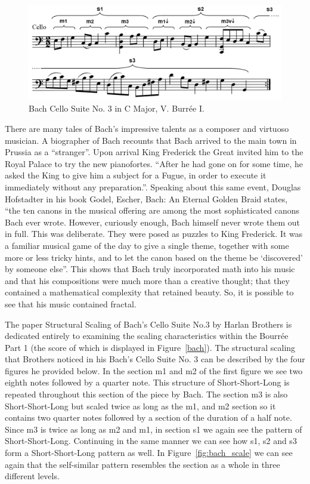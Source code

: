 \documentclass{article}
\begin{document}
\begin{figure}[ht!]
    \centering
    \includegraphics[width=\linewidth]{figures/bach_cello.png}
    \caption{%
        Bach Cello Suite No. 3 in C Major, V. Burrée I.
    }\label{fig:bach}
\end{figure}

There are many tales of Bach's impressive talents as a composer and virtuoso
musician. A biographer of Bach recounts that Bach arrived to the main  town in
Prussia as a “stranger”. Upon arrival King Frederick the Great invited him to
the Royal Palace to try the new pianofortes. ``After he had gone on for some
time, he asked the King to give him a subject for a Fugue, in order to execute
it immediately without any preparation.''\cite{6}. Speaking about this same event,
Douglas Hofstadter in his book Godel, Escher, Bach: An Eternal Golden Braid
states, ``the ten canons in the musical offering are among the most sophisticated
canons Bach ever wrote. However, curiously enough, Bach himself never wrote them
out in full. This was deliberate. They were posed as puzzles to King Frederick.
It was a familiar musical game of the day to give a single theme, together with
some more or less tricky hints, and to let the canon based on the theme be
`discovered' by someone else''\cite{7}. This shows that Bach truly incorporated math
into his music and that his compositions were much more than a creative thought;
that they contained a mathematical complexity that retained beauty. So, it is
possible to see that his music contained fractal.

The paper Structural Scaling of Bach’s Cello Suite No.3 by Harlan Brothers is
dedicated entirely to examining the scaling characteristics within the Bourrée
Part 1 (the score of which is displayed in Figure~\ref{bach}). The structural
scaling that Brothers noticed in his Bach’s Cello Suite No. 3 can be described
by the four figures he provided below. In the section m1 and m2 of the first
figure we see two eighth notes followed by a
quarter note. This structure of Short-Short-Long is repeated throughout this
section of the piece by Bach. The section m3 is also Short-Short-Long but scaled
twice as long as the m1, and m2 section so it contains two quarter notes
followed by a section of the duration of a half note. Since m3 is twice as long
as m2 and m1, in section s1 we again see the pattern of Short-Short-Long.
Continuing in the same manner we can see how s1, s2 and s3 form a
Short-Short-Long pattern as well. In Figure~\ref{fig:bach_scale} we can see again 
that the self-similar pattern resembles the section as a whole in three
different levels. 
\end{document}
